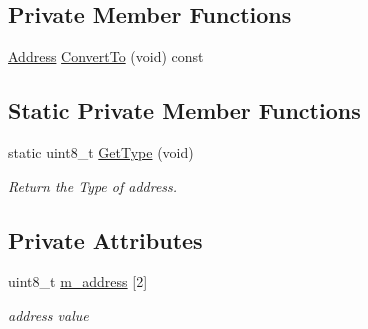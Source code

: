 \subsection*{Private Member Functions}
\begin{DoxyCompactItemize}
\item 
\hyperlink{classns3_1_1Address}{Address} \hyperlink{classns3_1_1Mac16Address_a25a998b78d7654c4963ada1232d42fb8}{Convert\+To} (void) const 
\end{DoxyCompactItemize}
\subsection*{Static Private Member Functions}
\begin{DoxyCompactItemize}
\item 
static uint8\+\_\+t \hyperlink{classns3_1_1Mac16Address_a0cf82ff2c102274ac243b24f95992680}{Get\+Type} (void)
\begin{DoxyCompactList}\small\item\em Return the Type of address. \end{DoxyCompactList}\end{DoxyCompactItemize}
\subsection*{Private Attributes}
\begin{DoxyCompactItemize}
\item 
uint8\+\_\+t \hyperlink{classns3_1_1Mac16Address_ac0c8dd3fecc6d12c91fe96576f4f96a8}{m\+\_\+address} \mbox{[}2\mbox{]}
\begin{DoxyCompactList}\small\item\em address value \end{DoxyCompactList}\end{DoxyCompactItemize}
